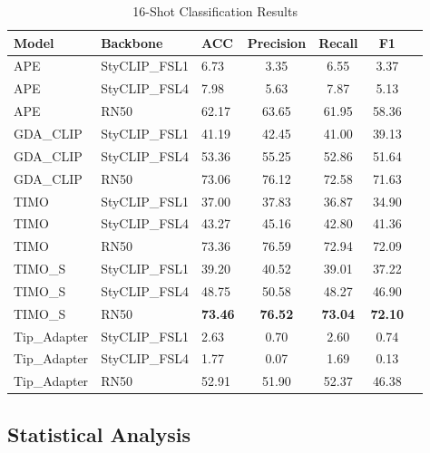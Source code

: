 \documentclass[conference,6pt]{IEEEtran}
\begin{document}
\begin{table}[H]
\centering
\tiny
\caption{16-Shot Classification Results}
\label{tab:results_16shot}
\begin{tabular}{@{}lll*{4}{S[table-format=2.2]}@{}}
\toprule
\textbf{Model} & \textbf{Backbone} & \textbf{ACC} & \textbf{Precision} & \textbf{Recall} & \textbf{F1} \\
\midrule
APE & StyCLIP\_FSL1 & 6.73 & 3.35 & 6.55 & 3.37 \\
APE & StyCLIP\_FSL4 & 7.98 & 5.63 & 7.87 & 5.13 \\
APE & RN50 & 62.17 & 63.65 & 61.95 & 58.36 \\
GDA\_CLIP & StyCLIP\_FSL1 & 41.19 & 42.45 & 41.00 & 39.13 \\
GDA\_CLIP & StyCLIP\_FSL4 & 53.36 & 55.25 & 52.86 & 51.64 \\
GDA\_CLIP & RN50 & 73.06 & 76.12 & 72.58 & 71.63 \\
TIMO & StyCLIP\_FSL1 & 37.00 & 37.83 & 36.87 & 34.90 \\
TIMO & StyCLIP\_FSL4 & 43.27 & 45.16 & 42.80 & 41.36 \\
TIMO & RN50 & 73.36 & 76.59 & 72.94 & 72.09 \\
TIMO\_S & StyCLIP\_FSL1 & 39.20 & 40.52 & 39.01 & 37.22 \\
TIMO\_S & StyCLIP\_FSL4 & 48.75 & 50.58 & 48.27 & 46.90 \\
TIMO\_S & RN50 & \textbf{73.46} & \textbf{76.52} & \textbf{73.04} & \textbf{72.10} \\
Tip\_Adapter & StyCLIP\_FSL1 & 2.63 & 0.70 & 2.60 & 0.74 \\
Tip\_Adapter & StyCLIP\_FSL4 & 1.77 & 0.07 & 1.69 & 0.13 \\
Tip\_Adapter & RN50 & 52.91 & 51.90 & 52.37 & 46.38 \\
\bottomrule
\end{tabular}
\end{table}

\clearpage
\subsection{Statistical Analysis}
\end{document}
